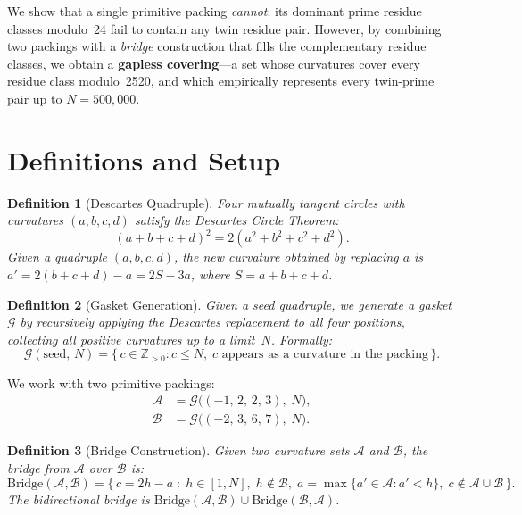 \documentclass[12pt,a4paper]{article}
\newtheorem{definition}{Definition}
\theoremstyle{remark}
\begin{document}
We show that a single primitive packing \emph{cannot}: its dominant prime
residue classes modulo~24 fail to contain any twin residue pair.  However,
by combining two packings with a \emph{bridge} construction that fills the
complementary residue classes, we obtain a \textbf{gapless covering}---a
set whose curvatures cover every residue class modulo~2520, and which
empirically represents every twin-prime pair up to $N=500{,}000$.

\section{Definitions and Setup}

\begin{definition}[Descartes Quadruple]
Four mutually tangent circles with curvatures $(a,b,c,d)$ satisfy the
\emph{Descartes Circle Theorem}:
\[
(a+b+c+d)^2 = 2(a^2+b^2+c^2+d^2).
\]
Given a quadruple $(a,b,c,d)$, the new curvature obtained by replacing
$a$ is $a' = 2(b+c+d) - a = 2S - 3a$, where $S = a+b+c+d$.
\end{definition}

\begin{definition}[Gasket Generation]
Given a seed quadruple, we generate a gasket $\mathcal{G}$ by recursively
applying the Descartes replacement to all four positions, collecting all
positive curvatures up to a limit~$N$. Formally:
\[
\mathcal{G}(\text{seed},\, N) =
\bigl\{\, c \in \mathbb{Z}_{>0} : c \leq N,\;
c \text{ appears as a curvature in the packing}\,\bigr\}.
\]
\end{definition}

We work with two primitive packings:
\begin{align}
\mathcal{A} &= \mathcal{G}\bigl((-1,\,2,\,2,\,3),\; N\bigr),
\label{eq:seedA}\\
\mathcal{B} &= \mathcal{G}\bigl((-2,\,3,\,6,\,7),\; N\bigr).
\label{eq:seedB}
\end{align}

\begin{definition}[Bridge Construction]
Given two curvature sets $\mathcal{A}$ and $\mathcal{B}$, the
\emph{bridge from $\mathcal{A}$ over $\mathcal{B}$} is:
\[
\text{Bridge}(\mathcal{A},\mathcal{B}) =
\bigl\{\, c = 2h - a \;:\;
h \in [1,N],\; h \notin \mathcal{B},\;
a = \max\{a' \in \mathcal{A} : a' < h\},\;
c \notin \mathcal{A} \cup \mathcal{B}\,\bigr\}.
\]
The \emph{bidirectional bridge} is
$\text{Bridge}(\mathcal{A},\mathcal{B})
\cup \text{Bridge}(\mathcal{B},\mathcal{A})$.
\end{definition}
\end{document}
